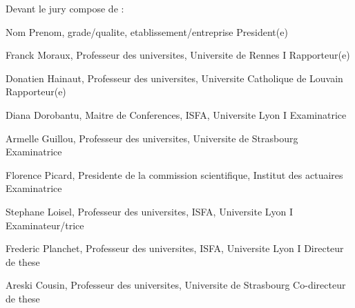 \begin{titlepage}
\fontsize{11pt}{13pt}\selectfont
Devant le jury compose de :
\medskip

\fontsize{9pt}{11pt}\selectfont

Nom Prenom, grade/qualite, etablissement/entreprise \hfill President(e)

\medskip

Franck Moraux, Professeur des universites, Universite de Rennes I \hfill  Rapporteur(e)

Donatien Hainaut,  Professeur des universites, Universite Catholique de Louvain \hfill Rapporteur(e)

Diana Dorobantu, Maitre de Conferences, ISFA, Universite Lyon I \hfill Examinatrice

Armelle Guillou, Professeur des universites, Universite de Strasbourg \hfill Examinatrice

Florence Picard, Presidente de la commission scientifique, Institut des actuaires \hfill Examinatrice

Stephane Loisel, Professeur des universites, ISFA, Universite Lyon I \hfill Examinateur/trice

\medskip

Frederic Planchet, Professeur des universites, ISFA, Universite Lyon I \hfill Directeur de these

Areski Cousin, Professeur des universites, Universite de Strasbourg \hfill Co-directeur de these %

\newpage
\end{titlepage}


